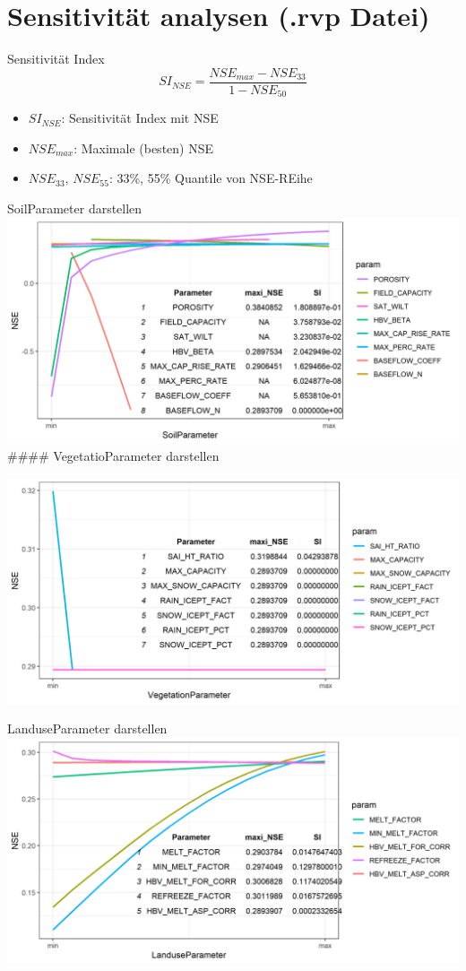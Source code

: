 
\hypertarget{sensitivituxe4t-analysen-.rvp-datei}{%
\part{Sensitivität analysen (.rvp
Datei)}\label{sensitivituxe4t-analysen-.rvp-datei}}

\begin{frame}{Sensitivität Index}
\protect\hypertarget{sensitivituxe4t-index}{}
\[
SI_{NSE}=\frac{NSE_{max} - NSE_{33}}{1-NSE_{50}}
\]

\begin{itemize}
\item
  \(SI_{NSE}\): Sensitivität Index mit NSE
\item
  \(NSE_{max}\): Maximale (besten) NSE
\item
  \(NSE_{33}\), \(NSE_{55}\): 33\%, 55\% Quantile von NSE-REihe
\end{itemize}
\end{frame}

\begin{frame}{SoilParameter darstellen}
\protect\hypertarget{soilparameter-darstellen}{}
\includegraphics{plot_soil.png} \#\#\#\# VegetatioParameter darstellen

\includegraphics{plot_Veg.png}
\end{frame}

\begin{frame}{LanduseParameter darstellen}
\protect\hypertarget{landuseparameter-darstellen}{}
\includegraphics{plot_Land.png}
\end{frame}
